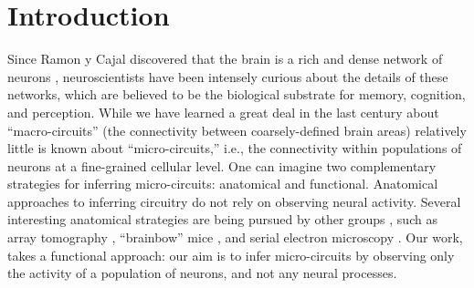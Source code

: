 \documentclass[aoas,preprint]{imsart}
\begin{document}
\section{Introduction}
\label{intro}
Since Ramon y Cajal discovered that the brain is a rich and dense network of neurons \cite{RamonyCajal04,RamonyCajal23}, neuroscientists have been intensely curious about the details of these networks, which are believed to be the biological substrate for memory, cognition, and perception. While we have learned a great deal in the last century about ``macro-circuits'' (the connectivity between coarsely-defined brain areas) relatively little is known about ``micro-circuits,'' i.e., the connectivity within populations of neurons at a fine-grained cellular level. One can imagine two complementary strategies for inferring micro-circuits: anatomical and functional. Anatomical approaches to inferring circuitry do not rely on observing neural activity.  Several interesting anatomical strategies are being pursued by other groups , such as array tomography \cite{MichevaSmith07}, ``brainbow'' mice \cite{Brainbow07}, and serial electron microscopy \cite{Briggman2006}. Our work,  takes a functional approach: our aim is to infer micro-circuits by observing only the activity of a population of neurons, and not any neural processes.
\end{document}
